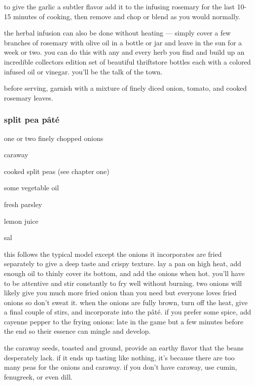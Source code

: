 to give the garlic a subtler flavor add it to the infusing rosemary
for the last 10-15 minutes of cooking, then remove and chop or blend
as you would normally.

the herbal infusion can also be done without heating --- simply cover
a few branches of rosemary with olive oil in a bottle or jar and leave
in the sun for a week or two. you can do this with any and every herb
you find and build up an incredible collectors edition set of
beautiful thriftstore bottles each with a colored infused oil or
vinegar. you'll be the talk of the town.

before serving, garnish with a mixture of finely diced onion, tomato,
and cooked rosemary leaves.

\subsubsection{split pea p\^{a}t\'{e}}

\begin{ingredients}
  \item one or two finely chopped onions
  \item caraway
  \item cooked split peas (see chapter one)
  \item some vegetable oil
  \item fresh parsley
  \item lemon juice
  \item sal
\end{ingredients}

this follows the typical model except the onions it incorporates are
fried separately to give a deep taste and crispy texture. lay a pan on
high heat, add enough oil to thinly cover its bottom, and add the
onions when hot. you'll have to be attentive and stir constantly to
fry well without burning. two onions will likely give you much more
fried onion than you need but everyone loves fried onions so don't
sweat it. when the onions are fully brown, turn off the heat, give a
final couple of stirs, and incorporate into the p\^{a}t\'{e}. if you
prefer some spice, add cayenne pepper to the frying onions: late in
the game but a few minutes before the end so their essence can mingle
and develop.

the caraway seeds, toasted and ground, provide an earthy flavor that
the beans desperately lack. if it ends up tasting like nothing,
it's because there are too many peas for the onions and caraway. if
you don't have caraway, use cumin, fenugreek, or even dill.

